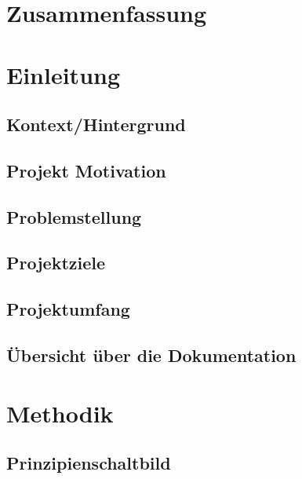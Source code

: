 
\section{Zusammenfassung}
\label{sec:zusammenfassung}



\section{Einleitung}
\label{sec:einleitung}



\subsection{Kontext/Hintergrund}


\subsection{Projekt Motivation}


\subsection{Problemstellung}


\subsection{Projektziele}


\subsection{Projektumfang}


\subsection{Übersicht über die Dokumentation}


\section{Methodik}
\label{sec:methodik}



\subsection{Prinzipienschaltbild}
\label{subsec:prinzipienschaltbild}

